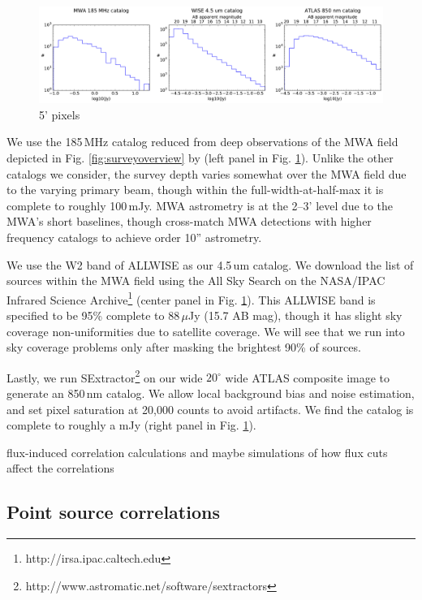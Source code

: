 \documentclass[preprint]{aastex}
\begin{document}
\begin{figure}[h]
\centering
\includegraphics[width=6.5in]{images/catalog_histograms.pdf}
\caption{5' pixels}
\label{fig:cataloghistograms}
\end{figure}

We use the 185\,MHz catalog reduced from deep observations of the MWA field depicted in Fig. \ref{fig:surveyoverview} by \citep{PattiCatalog1} (left panel in Fig. \ref{fig:cataloghistograms}). Unlike the other catalogs we consider, the survey depth varies somewhat over the MWA field due to the varying primary beam, though within the full-width-at-half-max it is complete to roughly 100\,mJy. MWA astrometry is at the 2--3' level due to the MWA's short baselines, though \citep{PattiCatalog1} cross-match MWA detections with higher frequency catalogs to achieve order 10'' astrometry. 

We use the W2 band of ALLWISE \citep{Wright2010,allwise} as our 4.5\,um catalog. We download the list of sources within the MWA field using the All Sky Search on the NASA/IPAC Infrared Science Archive\footnote{http://irsa.ipac.caltech.edu} (center panel in Fig. \ref{fig:cataloghistograms}). This ALLWISE band is specified to be 95\% complete to 88\,$\mu$Jy (15.7 AB mag), though it has slight sky coverage non-uniformities due to satellite coverage. We will see that we run into sky coverage problems only after masking the brightest 90\% of sources.

Lastly, we run SExtractor\footnote{http://www.astromatic.net/software/sextractors} \citep{sextractor} on our wide $20^\circ$ wide ATLAS composite image to generate an 850\,nm catalog. We allow local background bias and noise estimation, and set pixel saturation at 20,000 counts to avoid artifacts. We find the catalog is complete to roughly a mJy (right panel in Fig. \ref{fig:cataloghistograms}). 





flux-induced correlation calculations and maybe simulations of how flux cuts affect the correlations

\subsection{Point source correlations}
\end{document}
